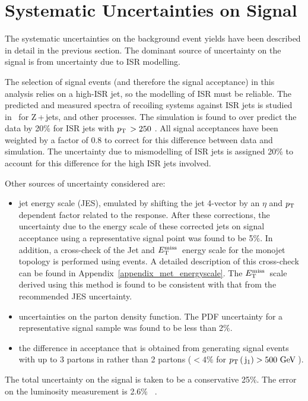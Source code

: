 \section{Systematic Uncertainties on Signal}
\label{sec:SYST}
The systematic uncertainties on the background event yields have been described in detail in the previous section. 
The dominant source of uncertainty on the signal is from uncertainty due to ISR modelling.

The selection of signal events (and therefore the signal acceptance) in this analysis relies on a high-\pt ISR jet, so the modelling of ISR must be reliable.
The predicted and measured \pt spectra of recoiling systems against ISR jets is studied in~\cite{CMSsinglelep} for Z\,+\,jets, 
\ttbar and other processes. 
The simulation is found to over predict the data by 20\% for ISR jets with $p_{\text{T}}\, > 250$ \GeV.
All signal acceptances have been weighted by a factor of 0.8 to correct for this difference between data and simulation.
The uncertainty due to mismodelling of ISR jets is assigned 20\% to account for this difference for the high \pt ISR jets involved.


Other sources of uncertainty considered are:
\begin{itemize}
  \item jet energy scale (JES), emulated by shifting the jet 4-vector 
   by an $\eta$ and $p_{\text{T}}\,$ dependent factor related to the 
   response.  After these corrections, the uncertainty due to the energy scale of these corrected jets on signal acceptance using a representative signal point was found to be 5$\%$.
 In addition, a cross-check of the Jet and $E_{\text{T}}^{\text{miss}}\,$ energy scale for the monojet topology is performed using \zmumu events. A detailed description of this cross-check can be found in Appendix~\ref{appendix_met_energyscale}. The $E_{\text{T}}^{\text{miss}}\,$ scale derived using this method is found to be consistent with that from the recommended JES uncertainty. 
  \item uncertainties on the parton density function. The PDF uncertainty for a representative signal sample was found to be less than 2$\%$. 
  \item the difference in acceptance that is obtained from generating signal events with up to 3 partons in \MADGRAPH rather than 2 partons ($<4\%$ for $p_{\text{T}}\,(\,\mathrm{j}_1) > 500~\mathrm{GeV}\,$). 
\end{itemize}

The total uncertainty on the signal is taken to be a conservative 25$\%$.
The error on the luminosity measurement is 2.6\% ~\cite{lumi:Summer2013}.


